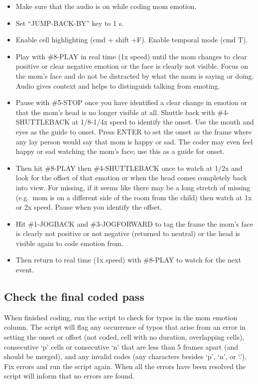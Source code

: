 \documentclass[
]{book}
\providecommand{\tightlist}{%
  \setlength{\itemsep}{0pt}\setlength{\parskip}{0pt}}
\begin{document}
\begin{itemize}
\tightlist
\item
  Make sure that the audio is on while coding mom emotion.
\item
  Set ``JUMP-BACK-BY'' key to 1 s.
\item
  Enable cell highlighting (cmd + shift +F). Enable temporal mode (cmd T).
\item
  Play with \#8-PLAY in real time (1x speed) until the mom changes to clear positive or clear negative emotion or the face is clearly not visible. Focus on the mom's face and do not be distracted by what the mom is saying or doing. Audio gives context and helps to distinguish talking from emoting.
\item
  Pause with \#5-STOP once you have identified a clear change in emotion or that the mom's head is no longer visible at all. Shuttle back with \#4-SHUTTLEBACK at 1/8-1/4x speed to identify the onset. Use the mouth and eyes as the guide to onset. Press ENTER to set the onset as the frame where any lay person would say that mom is happy or sad. The coder may even feel happy or sad watching the mom's face; use this as a guide for onset.
\item
  Then hit \#8-PLAY then \#4-SHUTTLEBACK once to watch at 1/2x and look for the offset of that emotion or when the head comes completely back into view. For missing, if it seems like there may be a long stretch of missing (e.g.~mom is on a different side of the room from the child) then watch at 1x or 2x speed. Pause when you identify the offset.
\item
  Hit \#1-JOGBACK and \#3-JOGFORWARD to tag the frame the mom's face is clearly not positive or not negative (returned to neutral) or the head is visible again to code emotion from.
\item
  Then return to real time (1x speed) with \#8-PLAY to watch for the next event.
\end{itemize}

\hypertarget{check-the-final-coded-pass-1}{%
\subsection{Check the final coded pass}\label{check-the-final-coded-pass-1}}

When finished coding, run the script to check for typos in the mom emotion column. The script will flag any occurrence of typos that arise from an error in setting the onset or offset (not coded, cell with no duration, overlapping cells), consecutive `p' cells or consecutive `n' that are less than 5 frames apart (and should be merged), and any invalid codes (any characters besides `p', `n', or `.'). Fix errors and run the script again. When all the errors have been resolved the script will inform that no errors are found.
\end{document}
